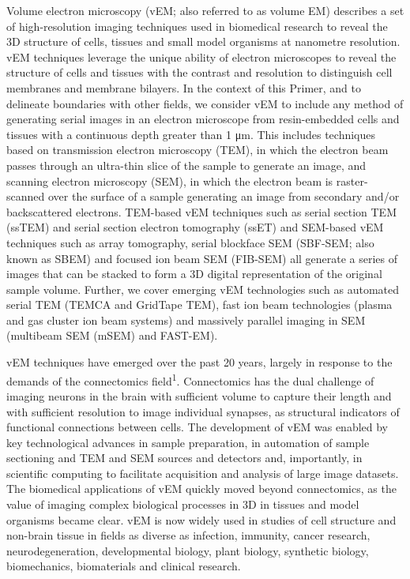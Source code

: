 \documentclass{article}
\begin{document}
Volume electron microscopy (vEM; also referred to as volume EM) describes a set of high-resolution imaging techniques used in biomedical research to reveal the 3D structure of cells, tissues and small model organisms at nanometre resolution. vEM techniques leverage the unique ability of electron microscopes to reveal the structure of cells and tissues with the contrast and resolution to distinguish cell membranes and membrane bilayers. In the context of this Primer, and to delineate boundaries with other fields, we consider vEM to include any method of generating serial images in an electron microscope from resin-embedded cells and tissues with a continuous depth greater than 1 μm. This includes techniques based on transmission electron microscopy (TEM), in which the electron beam passes through an ultra-thin slice of the sample to generate an image, and scanning electron microscopy (SEM), in which the electron beam is raster-scanned over the surface of a sample generating an image from secondary and/or backscattered electrons. TEM-based vEM techniques such as serial section TEM (ssTEM) and serial section electron tomography (ssET) and SEM-based vEM techniques such as array tomography, serial blockface SEM (SBF-SEM; also known as SBEM) and focused ion beam SEM (FIB-SEM) all generate a series of images that can be stacked to form a 3D digital representation of the original sample volume. Further, we cover emerging vEM technologies such as automated serial TEM (TEMCA and GridTape TEM), fast ion beam technologies (plasma and gas cluster ion beam systems) and massively parallel imaging in SEM (multibeam SEM (mSEM) and FAST-EM).

vEM techniques have emerged over the past 20 years, largely in response to the demands of the connectomics field\textsuperscript{1}. Connectomics has the dual challenge of imaging neurons in the brain with sufficient volume to capture their length and with sufficient resolution to image individual synapses, as structural indicators of functional connections between cells. The development of vEM was enabled by key technological advances in sample preparation, in automation of sample sectioning and TEM and SEM sources and detectors and, importantly, in scientific computing to facilitate acquisition and analysis of large image datasets. The biomedical applications of vEM quickly moved beyond connectomics, as the value of imaging complex biological processes in 3D in tissues and model organisms became clear. vEM is now widely used in studies of cell structure and non-brain tissue in fields as diverse as infection, immunity, cancer research, neurodegeneration, developmental biology, plant biology, synthetic biology, biomechanics, biomaterials and clinical research.
\end{document}
